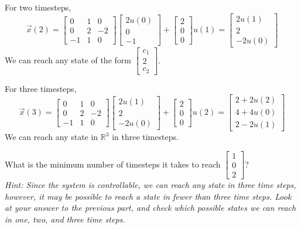 \begin{enumerate}[resume]
{    For two timesteps,
    \[\vec{x}(2) = 
    \begin{bmatrix}
        0 & 1 & 0 \\
        0 & 2 & -2 \\
        -1 & 1 & 0
    \end{bmatrix} 
    \begin{bmatrix} 
        2u(0) \\ 0 \\ -1 
    \end{bmatrix}
    + \begin{bmatrix}
        2 \\ 0 \\ 0
    \end{bmatrix} u(1) =
    \begin{bmatrix} 
        2u(1) \\ 2 \\ -2u(0) 
    \end{bmatrix}\]
    We can reach any state of the form $\begin{bmatrix} c_1 \\ 2 \\ c_2 \end{bmatrix}$. \\
    \newline

    For three timesteps,
    \[\vec{x}(3) = 
    \begin{bmatrix}
        0 & 1 & 0 \\
        0 & 2 & -2 \\
        -1 & 1 & 0
    \end{bmatrix} 
    \begin{bmatrix} 
        2u(1) \\ 2 \\ -2u(0) 
    \end{bmatrix}
    + \begin{bmatrix}
        2 \\ 0 \\ 0
    \end{bmatrix} u(2) =
    \begin{bmatrix} 
        2 + 2u(2) \\ 4 + 4u(0) \\ 2 - 2u(1) 
    \end{bmatrix}\] 
    We can reach any state in $\mathbb{R}^3$ in three timesteps.
  }

  \qitem What is the minimum number of timesteps it takes to reach $\begin{bmatrix} 1 \\ 0 \\ 2 \end{bmatrix}$? \\
    \textit{Hint: 
      Since the system is controllable, we can reach any state in three time steps, however, it may be possible to reach a state in fewer than three time steps. Look at your answer to the previous part, and check which possible states we can reach in one, two, and three time steps.
    }
    

\end{enumerate}

